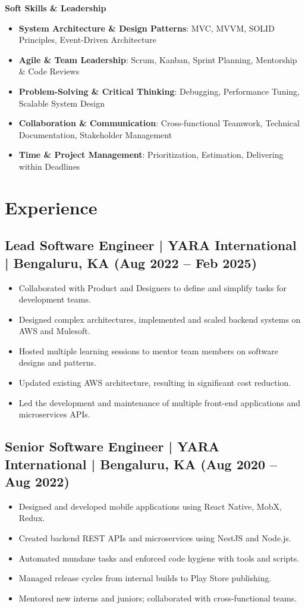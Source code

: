 \documentclass[10pt,a4paper]{article}
\begin{document}
\textbf{Soft Skills \& Leadership}
\begin{itemize}[leftmargin=*]
  \item \textbf{System Architecture \& Design Patterns}: MVC, MVVM, SOLID Principles, Event-Driven Architecture
  \item \textbf{Agile \& Team Leadership}: Scrum, Kanban, Sprint Planning, Mentorship \& Code Reviews
  \item \textbf{Problem-Solving \& Critical Thinking}: Debugging, Performance Tuning, Scalable System Design
  \item \textbf{Collaboration \& Communication}: Cross-functional Teamwork, Technical Documentation, Stakeholder Management
  \item \textbf{Time \& Project Management}: Prioritization, Estimation, Delivering within Deadlines
\end{itemize}

\section*{Experience}

\subsection*{Lead Software Engineer | YARA International | Bengaluru, KA (Aug 2022 -- Feb 2025)}
\begin{itemize}[leftmargin=*]
  \item Collaborated with Product and Designers to define and simplify tasks for development teams.
  \item Designed complex architectures, implemented and scaled backend systems on AWS and Mulesoft.
  \item Hosted multiple learning sessions to mentor team members on software designs and patterns.
  \item Updated existing AWS architecture, resulting in significant cost reduction.
  \item Led the development and maintenance of multiple front-end applications and microservices APIs.
\end{itemize}

\subsection*{Senior Software Engineer | YARA International | Bengaluru, KA (Aug 2020 -- Aug 2022)}
\begin{itemize}[leftmargin=*]
  \item Designed and developed mobile applications using React Native, MobX, Redux.
  \item Created backend REST APIs and microservices using NestJS and Node.js.
  \item Automated mundane tasks and enforced code hygiene with tools and scripts.
  \item Managed release cycles from internal builds to Play Store publishing.
  \item Mentored new interns and juniors; collaborated with cross-functional teams.
\end{itemize}
\end{document}
